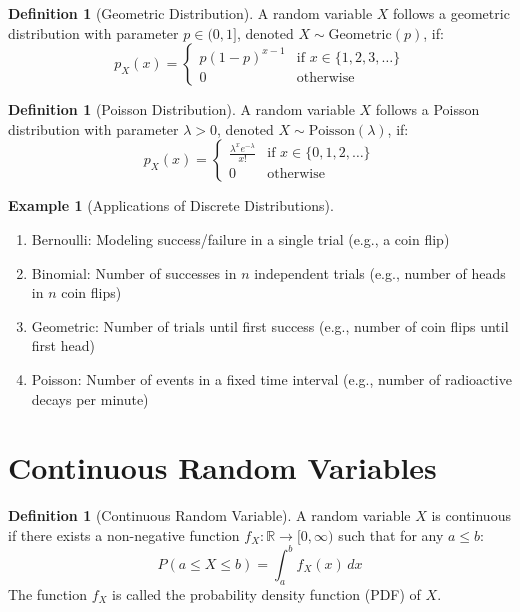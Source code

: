 \documentclass[12pt,a4paper]{article}
\theoremstyle{plain}
\theoremstyle{definition}
\newtheorem{definition}[theorem]{Definition}
\newtheorem{example}[theorem]{Example}
\begin{document}
\begin{definition}[Geometric Distribution]
A random variable $X$ follows a geometric distribution with parameter $p \in (0,1]$, denoted $X \sim \text{Geometric}(p)$, if:
\begin{equation}
p_X(x) = 
\begin{cases}
p(1-p)^{x-1} & \text{if } x \in \{1,2,3,\ldots\} \\
0 & \text{otherwise}
\end{cases}
\end{equation}
\end{definition}

\begin{definition}[Poisson Distribution]
A random variable $X$ follows a Poisson distribution with parameter $\lambda > 0$, denoted $X \sim \text{Poisson}(\lambda)$, if:
\begin{equation}
p_X(x) = 
\begin{cases}
\frac{\lambda^x e^{-\lambda}}{x!} & \text{if } x \in \{0,1,2,\ldots\} \\
0 & \text{otherwise}
\end{cases}
\end{equation}
\end{definition}

\begin{example}[Applications of Discrete Distributions]
\begin{enumerate}[label=(\roman*)]
\item Bernoulli: Modeling success/failure in a single trial (e.g., a coin flip)
\item Binomial: Number of successes in $n$ independent trials (e.g., number of heads in $n$ coin flips)
\item Geometric: Number of trials until first success (e.g., number of coin flips until first head)
\item Poisson: Number of events in a fixed time interval (e.g., number of radioactive decays per minute)
\end{enumerate}
\end{example}

\section{Continuous Random Variables}

\begin{definition}[Continuous Random Variable]
A random variable $X$ is continuous if there exists a non-negative function $f_X: \mathbb{R} \rightarrow [0,\infty)$ such that for any $a \leq b$:
\begin{equation}
P(a \leq X \leq b) = \int_a^b f_X(x) \, dx
\end{equation}
The function $f_X$ is called the probability density function (PDF) of $X$.
\end{definition}
\end{document}
